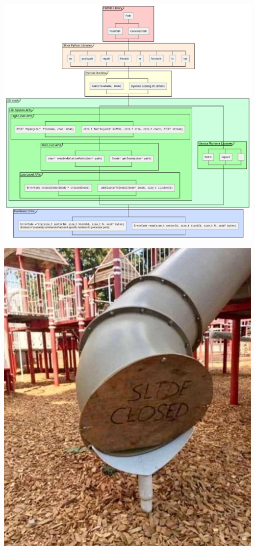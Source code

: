 \begin{frame}
%
\vspace{-16pt}
\begin{center}
\includegraphics[width=.66\linewidth]{./gfx/14-pathlib-stack}
\end{center}
%
\end{frame}


\begin{frame}
\begin{center}
\includegraphics[width=.47\linewidth]{./gfx/14-last-slide}
\end{center}
\end{frame}

